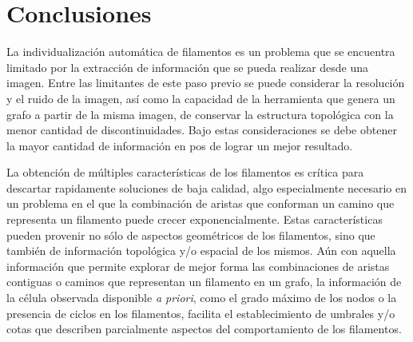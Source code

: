\chapter{Conclusiones}
\label{chap:conclu}
La individualizaci\'on autom\'atica de filamentos es un problema que se encuentra limitado por la extracci\'on de informaci\'on que se pueda realizar desde una imagen. Entre las limitantes de este paso previo se puede considerar la resoluci\'on y el ruido de la imagen, as\'i como la capacidad de la herramienta que genera un grafo a partir de la misma imagen, de conservar la estructura topol\'ogica con la menor cantidad de discontinuidades. Bajo estas consideraciones se debe  obtener la mayor cantidad de informaci\'on en pos de lograr un mejor resultado.



La obtenci\'on de m\'ultiples caracter\'isticas de los filamentos es cr\'itica para descartar rapidamente soluciones de baja calidad, algo especialmente necesario en un problema en el que la combinaci\'on de aristas que conforman un camino que representa un filamento puede crecer exponencialmente. Estas caracter\'isticas pueden provenir no s\'olo de aspectos geom\'etricos de los filamentos, sino que tambi\'en de informaci\'on topol\'ogica y/o espacial de los mismos.
A\'un con aquella informaci\'on que permite explorar de mejor forma las combinaciones de aristas contiguas o caminos que representan un filamento en un grafo, la informaci\'on de la c\'elula observada disponible {\it a priori}, como el grado m\'aximo de los nodos o la presencia de ciclos en los filamentos, facilita el establecimiento de umbrales y/o cotas que describen parcialmente aspectos del comportamiento de los filamentos.

